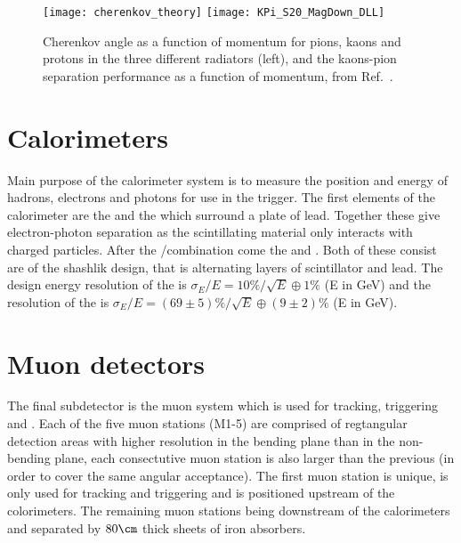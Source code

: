 \begin{figure}
  \begin{center}
    \texttt{[image: cherenkov\_theory]}
    \texttt{[image: KPi\_S20\_MagDown\_DLL]}
  \end{center}
  \caption{\small
    Cherenkov angle as a function of momentum for pions, kaons and protons in the three different
    radiators (left), and the kaons-pion separation performance as a function of momentum, from
    Ref.~\cite{LHCb-DP-2012-003}.
  }
  \label{fig:lhcb:rich}
\end{figure}






\section{Calorimeters}
Main purpose of the \lhcb calorimeter system is to measure the position and energy of hadrons,
electrons and photons for use in the \lone trigger.
The first elements of the calorimeter are the \spd and the \presh which surround a plate of lead.
Together these give electron-photon separation as the scintillating material only interacts with
charged particles.
After the \spd/\presh combination come the \ecal and \hcal.
Both of these consist are of the shashlik design, that is alternating layers of scintillator and
lead.
The design energy resolution of the \ecal is $\sigma_E/E = 10\%/\sqrt{E} \oplus 1\%$ (E in GeV)
and the resolution of the \hcal is $\sigma_E/E = (69\pm5)\%/\sqrt{E} \oplus (9\pm2)\%$ (E in GeV).



\section{Muon detectors}
The final subdetector is the muon system which is used for tracking, triggering and \pid.
Each of the five muon stations (M1-5) are comprised of regtangular detection areas with higher
resolution in the bending plane than in the non-bending plane, each consectutive muon station is
also larger than the previous (in order to cover the same angular acceptance).
The first muon station is unique, is only used for tracking and triggering and is positioned
upstream of the colorimeters.
The remaining muon stations being downstream of the calorimeters and separated by $80\cm$ thick
sheets of iron absorbers.

